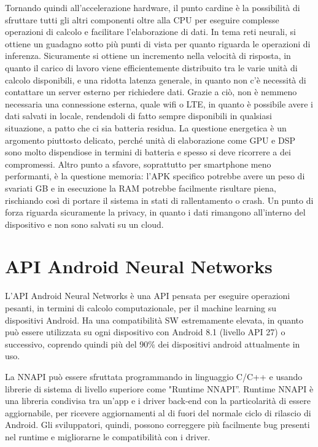 Tornando quindi all’accelerazione hardware, il punto cardine è la possibilità di sfruttare tutti gli altri componenti oltre alla CPU per eseguire complesse
operazioni di calcolo e facilitare l’elaborazione di dati. 
In tema reti neurali, si ottiene un guadagno sotto più punti di vista per quanto riguarda le operazioni di inferenza. Sicuramente si ottiene un incremento
nella velocità di risposta, in quanto il carico di lavoro viene efficientemente distribuito tra le varie unità di calcolo disponibili, e una ridotta
latenza generale, in quanto non c’è necessità di contattare un server esterno per richiedere dati.
Grazie a ciò, non è nemmeno necessaria una connessione esterna, quale wifi o LTE, in quanto è possibile avere i dati salvati in locale, rendendoli di fatto
sempre disponibili in qualsiasi situazione, a patto che ci sia batteria residua.
La questione energetica è un argomento piuttosto delicato, perché unità di elaborazione come GPU e DSP sono molto dispendiose in termini di batteria e
spesso si deve ricorrere a dei compromessi.
Altro punto a sfavore, soprattutto per smartphone meno performanti, è la questione memoria: l’APK specifico potrebbe avere un peso di svariati GB e in
esecuzione la RAM potrebbe facilmente risultare piena, rischiando così di portare il sistema in stati di rallentamento o crash.
Un punto di forza riguarda sicuramente la privacy, in quanto i dati rimangono all’interno del dispositivo e non sono salvati su un cloud.

\section{API Android Neural Networks}
L’API Android Neural Networks è una API pensata per eseguire operazioni pesanti, in termini di calcolo computazionale, per il machine learning su
dispositivi Android. Ha una compatibilità SW estremamente elevata, in quanto può essere utilizzata su ogni dispositivo con Android 8.1 (livello API 27) o successivo,
coprendo quindi più del 90\% dei dispositivi android attualmente in uso.

La NNAPI può essere sfruttata programmando in linguaggio C/C++ e usando librerie di sistema di livello superiore come "Runtime NNAPI”.
Runtime NNAPI è una libreria condivisa tra un’app e i driver back-end con la particolarità di essere aggiornabile, per ricevere aggiornamenti
al di fuori del normale ciclo di rilascio di Android. Gli sviluppatori, quindi, possono correggere più facilmente bug presenti nel runtime e migliorarne
le compatibilità con i driver.

